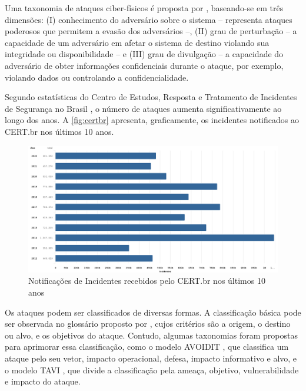         Uma taxonomia de ataques ciber-físicos é proposta por , baseando-se em três dimensões: (I) conhecimento do adversário sobre o sistema -- representa ataques poderosos que permitem a evasão dos adversários --, (II) grau de perturbação -- a capacidade de um adversário em afetar o sistema de destino violando sua integridade ou disponibilidade -- e (III) grau de divulgação -- a capacidade do adversário de obter informações confidenciais durante o ataque, por exemplo, violando dados ou controlando a confidencialidade.

        Segundo estatísticas do Centro de Estudos, Resposta e Tratamento de Incidentes de Segurança no Brasil \cite{cert2023}, o número de ataques aumenta significativamente ao longo dos anos. A \autoref{fig:certbr} apresenta, graficamente, os incidentes notificados ao CERT.br nos últimos 10 anos.

        \begin{figure}[htbp]
            \caption{\label{fig:certbr} Notificações de Incidentes recebidos pelo CERT.br nos últimos 10 anos}
            \begin{center}
                \includegraphics[width=1\textwidth]{USPSC-img/certbr.png}
            \end{center}
        \end{figure}

        Os ataques podem ser classificados de diversas formas. A classificação básica pode ser observada no glossário proposto por , cujos critérios são a origem, o destino ou alvo, e os objetivos do ataque. Contudo, algumas taxonomias foram propostas para aprimorar essa classificação, como o modelo AVOIDIT \cite{simmons2009}, que classifica um ataque pelo seu vetor, impacto operacional, defesa, impacto informativo e alvo, e o modelo TAVI \cite{drias2015}, que divide a classificação pela ameaça, objetivo, vulnerabilidade e impacto do ataque.

